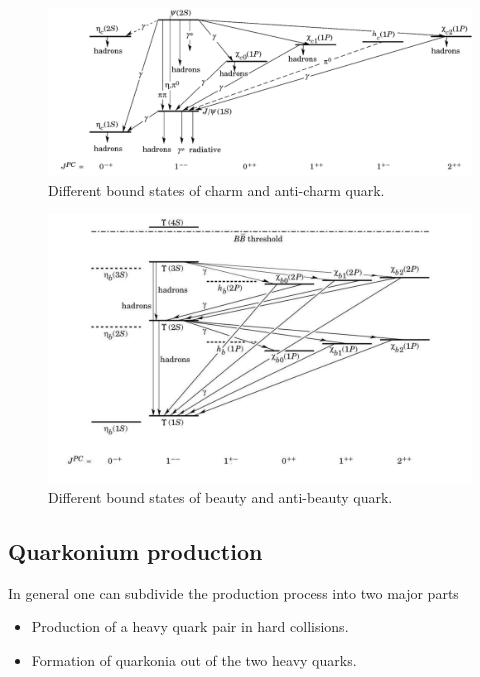 \begin{figure}
  \includegraphics[width=\hugefigwidth]{chap_QuarkoniaSurvey_figures/JPsiFamily}
  \caption[J/$\psi$ family]
   {Different bound states of charm and anti-charm quark.}
   \label{fig:JPsiFamily}
\end{figure}



\begin{figure}
  \includegraphics[width=\hugefigwidth]{chap_QuarkoniaSurvey_figures/UpsilonFamily}
  \caption[$\Upsilon$ family]
   {Different bound states of beauty and anti-beauty quark.}
   \label{fig:UpsilonFamily}
\end{figure}


\subsection{Quarkonium production}
In general one can subdivide the production process into two major parts
\begin{itemize}
\item Production of a heavy quark pair in hard collisions.
\item Formation of quarkonia out of the two heavy quarks.
\end{itemize}

